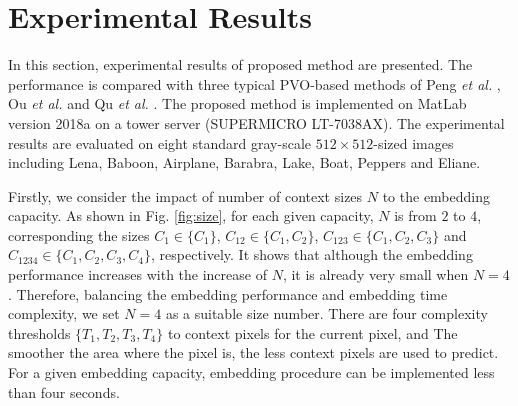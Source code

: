 \documentclass[review,3p,10pt,sort&compress]{elsarticle}
\begin{document}
\section{Experimental Results}\label{sec:4}
In this section, experimental results of proposed method are presented. The performance is compared with three typical PVO-based methods of Peng \emph{et al.} \cite{Peng2014IPVO}, Ou \emph{et al.} \cite{Ou2014PVOk} and Qu \emph{et al.} \cite{Qu2015PPVO}. The proposed method is implemented on MatLab version 2018a on a tower server (SUPERMICRO LT-7038AX). The experimental results are evaluated on eight standard gray-scale $512 \times 512$-sized images including Lena, Baboon, Airplane, Barabra, Lake, Boat, Peppers and Eliane.

Firstly, we consider the impact of number of context sizes $N$ to the embedding capacity. As shown in Fig. \ref{fig:size}, for each given capacity, $N$ is from $2$ to $4$, corresponding the sizes $C_1 \in \{C_1\}$, $C_{12} \in \{C_1, C_2\}$, $C_{123} \in \{C_1, C_2, C_3\}$ and $C_{1234} \in \{C_1, C_2, C_3, C_4\}$, respectively. It shows that although the embedding performance increases with the increase of $N$, it is already very small when $N = 4$. Therefore, balancing the embedding performance and embedding time complexity, we set $N = 4$ as a suitable size number. There are four complexity thresholds $\{T_1, T_2, T_3, T_4\}$ to context pixels for the current pixel, and The smoother the area where the pixel is, the less context pixels are used to predict. For a given embedding capacity, embedding procedure can be implemented less than four seconds.
\end{document}
